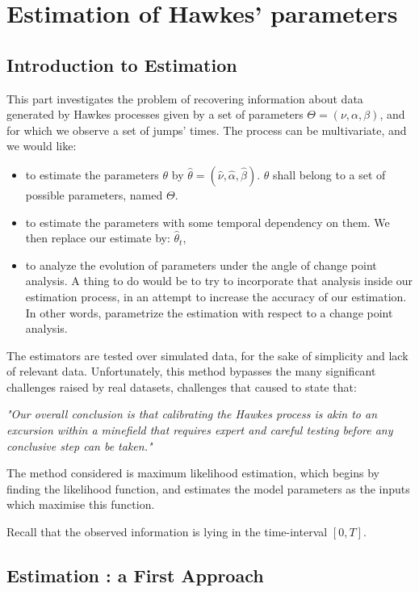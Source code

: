 

\part{Estimation of Hawkes' parameters}
\chapter{Introduction to Estimation}

This part investigates the problem of recovering information about data generated by Hawkes processes given by a set of parameters $\Theta = ( \nu, \alpha, \beta ) $, and for which we observe a set of jumps' times. The process can be multivariate, and we would like:

\begin{itemize}
\item to estimate the parameters $\theta$ by $\hat{\theta} = ( \hat{\nu}, \hat{\alpha}, \hat{\beta} )$. $\theta$ shall belong to a set of possible parameters, named $\Theta$.

\item to estimate the parameters with some temporal dependency on them. We then replace our estimate by: $\hat{\theta}_t$,
\item to analyze the evolution of parameters under the angle of change point analysis. A thing to do would be to try to incorporate that analysis inside our estimation process, in an attempt to increase the accuracy of our estimation. In other words, parametrize the estimation with respect to a change point analysis.
\end{itemize}


The estimators are tested over simulated data, for the sake of simplicity and lack of relevant data. Unfortunately, this method bypasses the many significant challenges raised by real datasets, challenges that caused \cite{critic_hawkes} to state that:

\textit{"Our overall conclusion is that calibrating the Hawkes process is akin to an excursion within a minefield that requires expert and careful testing before any conclusive step can be taken."}

The method considered is maximum likelihood estimation, which begins by finding the likelihood function, and estimates the model parameters as the inputs which maximise this function.

Recall that the observed information is lying in the time-interval $[0,T]$.
\chapter{Estimation : a First Approach}

